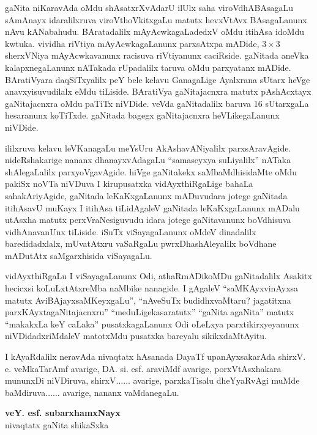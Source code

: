 gaNita niKaravAda oMdu shAsatxrXvAdarU ilUlx saha viroVdhABAsagaLu sAmAnayx idaralilxruva viroVthoVkitxgaLu matutx hevxVtAvx BAsagaLanunx nAvu kANabahudu. BArata\-dalilx mAyAcwkagaLadedxV oMdu itihAsa idoMdu kwtuka. vividha riVtiya mAyA\-cwkagaLanunx parxsAtxpa mADide, $3\times 3$ sherxVNiya mAyAcwkavanunx racisuva riVtiyanunx caciRside. gaNitada aneVka kalapxnegaLanunx nATakada rUpadalilx taruva oMdu parxya\-tanx mADide. BAratiVyara daqSiTxyalilx peY bele kelavu GanagaLige Ayalxrana sUtarx heVge anavxyisuvudilalx eMdu tiLiside. BAratiVya gaNitajacnxra matutx pAshAcxtayx gaNitaja\-cnxra oMdu paTiTx niVDide. veVda gaNitadalilx baruva {\rm 16} sUtarxgaLa hesaranunx koTiTxde. gaNitada bagegx gaNitajacnxra heVLikegaLanunx niVDide.

ililxruva kelavu leVKanagaLu meYsUru AkAshavANiyalilx parxsAravAgide. nideR\-shakarige nananx dhanayxvAdagaLu ``samaseyxya suLiyalilx'' nATaka shAlegaLalilx parxyoVga\-vAgide. hiVge gaNitakekx saMbaMdhisidaMte oMdu pakiSx noVTa niVDuva I kirupusatxka vidAyxthiR\-gaLige bahaLa sahakAriyAgide, gaNitada leKaKxgaLanunx mADuvudara jotege gaNitada itihAsavU muKayx I itihAsa tiLidAgaleV gaNitada leKaKxgaLanunx mADalu utAsxha matutx perxVraNesiguvudu idara jotege gaNitavanunx boVdhisuva vidhAnavanUnx tiLiside. iSuTx viSayagaLanunx oMdeV dinadalilx baredidadxlalx, mUvatAtxru vaSaRgaLu pwrxDhashAle\-yalilx boVdhane mADutAtx saMgarxhisida viSayagaLu.

vidAyxthiRgaLu I viSayagaLanunx Odi, athaRmADikoMDu gaNitadalilx Asakitx\- hecicxsi\- koLuLxtAtxreMba naMbike nanagide. I gAgaleV ``saMKAyxvinAyxsa matutx AviBAjayx\break saMKeyxgaLu'',  ``nAveSuTx budidhxvaMtaru? jagatitxna parxKAyxtagaNitajacnxru'' ``meduLige\break kasaratutx'' ``gaNita agaNita'' matutx ``makakxLa keY caLaka'' pusatxkagaLanunx Odi oLeLxya parxtikirxyeyanunx niVDi\-dadxriMdaleV matotxMdu pusatxka bareyalu sikikxdaMtAyitu.

\begin{center}
\noindent I kAyaRdalilx neravAda nivaqtatx hAsanada DayaTf upanAyxsakarAda shirxV. e. veMkaTarAmf avarige, DA. si. esf. araviMdf avarige, porxVtAsxhakara mununxDi niVDiruva, shirxV$\ldots\ldots$ avarige, parxkaTisalu dheYyaRvAgi muMde baMdiruva$\ldots\ldots$ avarige, nananx vaMdanegaLu.
\end{center}

\begin{flushright}
{\bf veY. esf. subarxhamxNayx}\\
nivaqtatx gaNita shikaSxka
\end{flushright}

